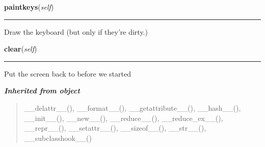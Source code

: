     \label{pygame-asteroids:virtual_keyboard:VirtualKeyboard:paintkeys}

    \vspace{0.5ex}

\hspace{.8\funcindent}\begin{boxedminipage}{\funcwidth}

    \raggedright \textbf{paintkeys}(\textit{self})

    \vspace{-1.5ex}

    \rule{\textwidth}{0.5\fboxrule}
\setlength{\parskip}{2ex}
    Draw the keyboard (but only if they're dirty.)

\setlength{\parskip}{1ex}
    \end{boxedminipage}

    \label{pygame-asteroids:virtual_keyboard:VirtualKeyboard:clear}

    \vspace{0.5ex}

\hspace{.8\funcindent}\begin{boxedminipage}{\funcwidth}

    \raggedright \textbf{clear}(\textit{self})

    \vspace{-1.5ex}

    \rule{\textwidth}{0.5\fboxrule}
\setlength{\parskip}{2ex}
    Put the screen back to before we started

\setlength{\parskip}{1ex}
    \end{boxedminipage}


\large{\textbf{\textit{Inherited from object}}}

\begin{quote}
\_\_delattr\_\_(), \_\_format\_\_(), \_\_getattribute\_\_(), \_\_hash\_\_(), \_\_init\_\_(), \_\_new\_\_(), \_\_reduce\_\_(), \_\_reduce\_ex\_\_(), \_\_repr\_\_(), \_\_setattr\_\_(), \_\_sizeof\_\_(), \_\_str\_\_(), \_\_subclasshook\_\_()
\end{quote}

